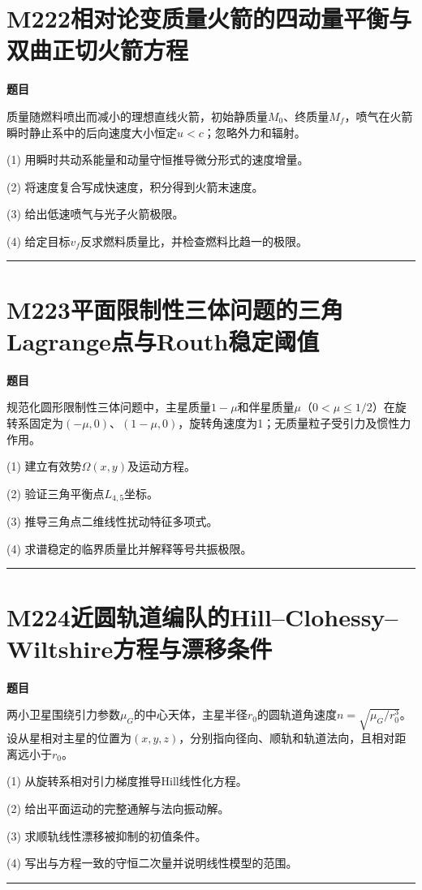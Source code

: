 \documentclass[UTF8,a4paper,11pt,oneside,openany]{ctexbook}
\begin{document}
\section*{M222\quad 相对论变质量火箭的四动量平衡与双曲正切火箭方程}
\textbf{题目}\par
质量随燃料喷出而减小的理想直线火箭，初始静质量$M_0$、终质量$M_f$，喷气在火箭瞬时静止系中的后向速度大小恒定$u<c$；忽略外力和辐射。
\par\smallskip\noindent (1) 用瞬时共动系能量和动量守恒推导微分形式的速度增量。
\par\smallskip\noindent (2) 将速度复合写成快速度，积分得到火箭末速度。
\par\smallskip\noindent (3) 给出低速喷气与光子火箭极限。
\par\smallskip\noindent (4) 给定目标$v_f$反求燃料质量比，并检查燃料比趋一的极限。
\par\medskip\hrule\medskip
\section*{M223\quad 平面限制性三体问题的三角Lagrange点与Routh稳定阈值}
\textbf{题目}\par
规范化圆形限制性三体问题中，主星质量$1-\mu$和伴星质量$\mu$（$0<\mu\le1/2$）在旋转系固定为$(-\mu,0)$、$(1-\mu,0)$，旋转角速度为1；无质量粒子受引力及惯性力作用。
\par\smallskip\noindent (1) 建立有效势$\Omega(x,y)$及运动方程。
\par\smallskip\noindent (2) 验证三角平衡点$L_{4,5}$坐标。
\par\smallskip\noindent (3) 推导三角点二维线性扰动特征多项式。
\par\smallskip\noindent (4) 求谱稳定的临界质量比并解释等号共振极限。
\par\medskip\hrule\medskip
\section*{M224\quad 近圆轨道编队的Hill–Clohessy–Wiltshire方程与漂移条件}
\textbf{题目}\par
两小卫星围绕引力参数$\mu_G$的中心天体，主星半径$r_0$的圆轨道角速度$n=\sqrt{\mu_G/r_0^3}$。设从星相对主星的位置为$(x,y,z)$，分别指向径向、顺轨和轨道法向，且相对距离远小于$r_0$。
\par\smallskip\noindent (1) 从旋转系相对引力梯度推导Hill线性化方程。
\par\smallskip\noindent (2) 给出平面运动的完整通解与法向振动解。
\par\smallskip\noindent (3) 求顺轨线性漂移被抑制的初值条件。
\par\smallskip\noindent (4) 写出与方程一致的守恒二次量并说明线性模型的范围。
\par\medskip\hrule\medskip
\end{document}
